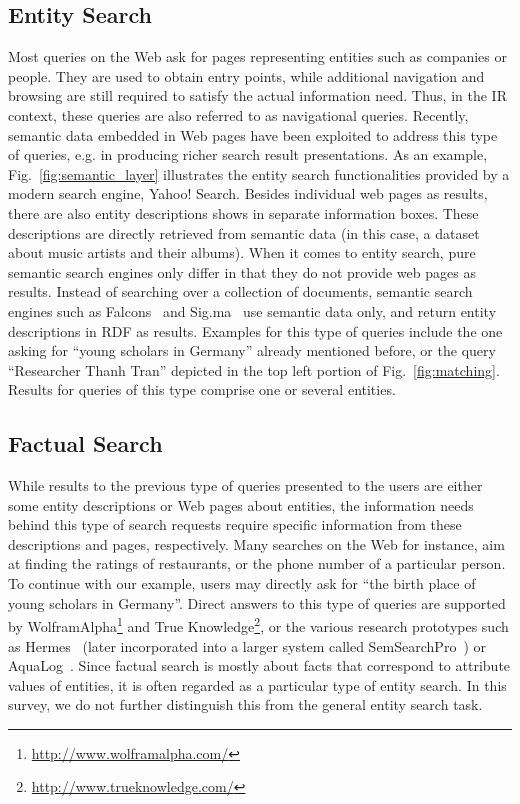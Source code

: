 \subsection{Entity Search} Most queries on the Web ask for pages representing entities such as companies or people. They are used to obtain entry points, while additional navigation and browsing are still required to satisfy the actual information need. Thus, in the IR context, these queries are also referred to as navigational queries. Recently, semantic data embedded in Web pages have been exploited to address this type of queries, e.g. in producing richer search result presentations. As an example, Fig.~\ref{fig:semantic_layer} illustrates the entity search functionalities provided by a modern search engine, Yahoo! Search. Besides individual web pages as results, there are also entity descriptions shows in separate information boxes. These descriptions are directly retrieved from semantic data (in this case, a dataset about music artists and their albums). When it comes to entity search, pure semantic search engines only differ in that they do not provide web pages as results. Instead of searching over a collection of documents, semantic search engines such as Falcons~\cite{DBLP:journals/ijswis/ChengQ09} and Sig.ma~\cite{DBLP:journals/ws/TummarelloCCDDD10} use semantic data only, and return entity descriptions in RDF as results. Examples for this type of queries include the one asking for ``young scholars in Germany'' already mentioned before, or the query ``Researcher Thanh Tran'' depicted in the top left portion of Fig.~\ref{fig:matching}. Results for queries of this type comprise one or several entities. 
	 
\subsection{Factual Search} While results to the previous type of queries presented to the users are either some entity descriptions or Web pages about entities, the information needs behind this type of search requests require specific information from these descriptions and pages, respectively. Many searches on the Web for instance, aim at finding the ratings of restaurants, or the phone number of a particular person. To continue with our example, users may directly ask for ``the birth place of young scholars in Germany''. Direct answers to this type of queries are supported by WolframAlpha\footnote{\url{http://www.wolframalpha.com/}} and True Knowledge\footnote{\url{http://www.trueknowledge.com/}}, or the various research prototypes such as Hermes~\cite{DBLP:journals/ws/TranWH09} (later incorporated into a larger system called SemSearchPro~\cite{DBLP:journals/ws/TranHL11}) or AquaLog~\cite{DBLP:journals/ws/LopezUMP07}. Since factual search is mostly about facts that correspond to attribute values of entities, it is often regarded as a particular type of entity search. In this survey, we do not further distinguish this from the general entity search task. 
 
